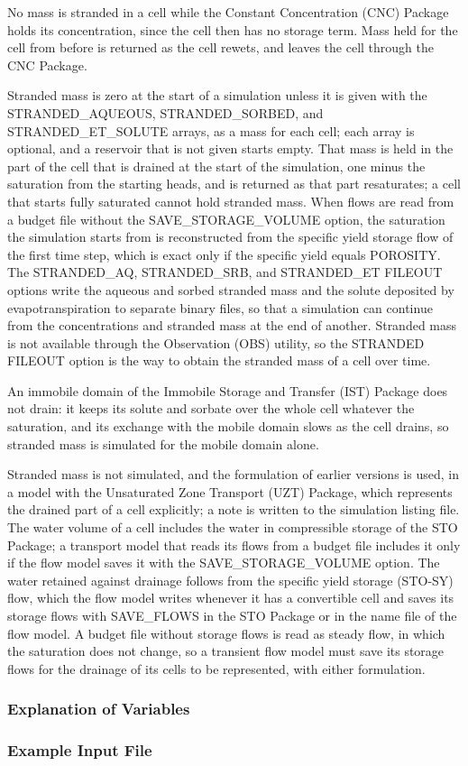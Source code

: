 No mass is stranded in a cell while the Constant Concentration (CNC) Package holds its concentration, since the cell then has no storage term.  Mass held for the cell from before is returned as the cell rewets, and leaves the cell through the CNC Package.

Stranded mass is zero at the start of a simulation unless it is given with the STRANDED\_AQUEOUS, STRANDED\_SORBED, and STRANDED\_ET\_SOLUTE arrays, as a mass for each cell; each array is optional, and a reservoir that is not given starts empty.  That mass is held in the part of the cell that is drained at the start of the simulation, one minus the saturation from the starting heads, and is returned as that part resaturates; a cell that starts fully saturated cannot hold stranded mass.  When flows are read from a budget file without the SAVE\_STORAGE\_VOLUME option, the saturation the simulation starts from is reconstructed from the specific yield storage flow of the first time step, which is exact only if the specific yield equals POROSITY.  The STRANDED\_AQ, STRANDED\_SRB, and STRANDED\_ET FILEOUT options write the aqueous and sorbed stranded mass and the solute deposited by evapotranspiration to separate binary files, so that a simulation can continue from the concentrations and stranded mass at the end of another.  Stranded mass is not available through the Observation (OBS) utility, so the STRANDED FILEOUT option is the way to obtain the stranded mass of a cell over time.

An immobile domain of the Immobile Storage and Transfer (IST) Package does not drain: it keeps its solute and sorbate over the whole cell whatever the saturation, and its exchange with the mobile domain slows as the cell drains, so stranded mass is simulated for the mobile domain alone.

Stranded mass is not simulated, and the formulation of earlier versions is used, in a model with the Unsaturated Zone Transport (UZT) Package, which represents the drained part of a cell explicitly; a note is written to the simulation listing file.  The water volume of a cell includes the water in compressible storage of the STO Package; a transport model that reads its flows from a budget file includes it only if the flow model saves it with the SAVE\_STORAGE\_VOLUME option.  The water retained against drainage follows from the specific yield storage (STO-SY) flow, which the flow model writes whenever it has a convertible cell and saves its storage flows with SAVE\_FLOWS in the STO Package or in the name file of the flow model.  A budget file without storage flows is read as steady flow, in which the saturation does not change, so a transient flow model must save its storage flows for the drainage of its cells to be represented, with either formulation.

\vspace{5mm}
\subsubsection{Explanation of Variables}
\begin{description}

\end{description}

\vspace{5mm}
\subsubsection{Example Input File}


